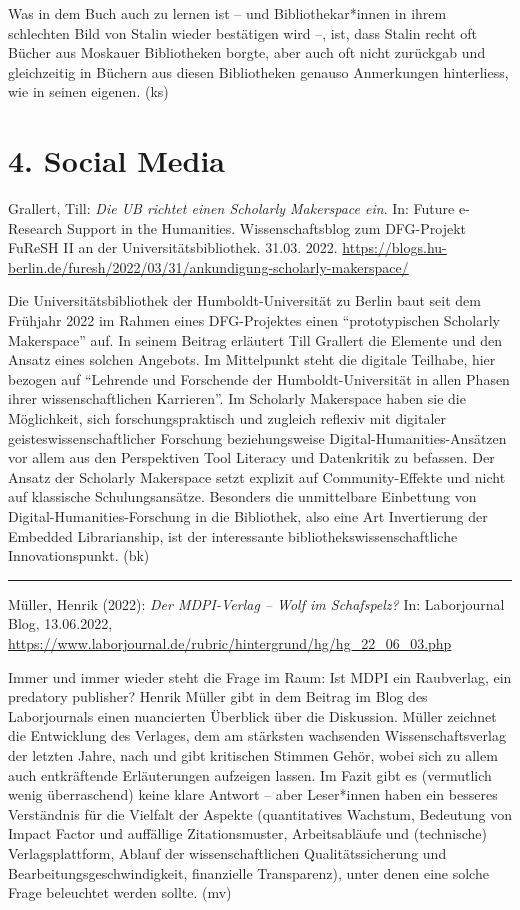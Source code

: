 \documentclass[a4paper,
fontsize=11pt,
oneside,
numbers=noperiodatend,
parskip=half-,
bibliography=totoc,
final
]{scrartcl}
\begin{document}
Was in dem Buch auch zu lernen ist -- und Bibliothekar*innen in ihrem
schlechten Bild von Stalin wieder bestätigen wird --, ist, dass Stalin
recht oft Bücher aus Moskauer Bibliotheken borgte, aber auch oft nicht
zurückgab und gleichzeitig in Büchern aus diesen Bibliotheken genauso
Anmerkungen hinterliess, wie in seinen eigenen. (ks)

\hypertarget{social-media}{%
\section{4. Social Media}\label{social-media}}

Grallert, Till: \emph{Die UB richtet einen Scholarly Makerspace ein}.
In: Future e-Research Support in the Humanities. Wissenschaftsblog zum
DFG-Projekt FuReSH II an der Universitätsbibliothek. 31.03. 2022.
\url{https://blogs.hu-berlin.de/furesh/2022/03/31/ankundigung-scholarly-makerspace/}

Die Universitätsbibliothek der Humboldt-Universität zu Berlin baut seit
dem Frühjahr 2022 im Rahmen eines DFG-Projektes einen
\enquote{prototypischen Scholarly Makerspace} auf. In seinem Beitrag
erläutert Till Grallert die Elemente und den Ansatz eines solchen
Angebots. Im Mittelpunkt steht die digitale Teilhabe, hier bezogen auf
\enquote{Lehrende und Forschende der Humboldt-Universität in allen
Phasen ihrer wissenschaftlichen Karrieren}. Im Scholarly Makerspace
haben sie die Möglichkeit, sich forschungspraktisch und zugleich
reflexiv mit digitaler geisteswissenschaftlicher Forschung
beziehungsweise Digital-Humanities-Ansätzen vor allem aus den
Perspektiven Tool Literacy und Datenkritik zu befassen. Der Ansatz der
Scholarly Makerspace setzt explizit auf Community-Effekte und nicht auf
klassische Schulungsansätze. Besonders die unmittelbare Einbettung von
Digital-Humanities-Forschung in die Bibliothek, also eine Art
Invertierung der Embedded Librarianship, ist der interessante
bibliothekswissenschaftliche Innovationspunkt. (bk)

\begin{center}\rule{0.5\linewidth}{0.5pt}\end{center}

Müller, Henrik (2022): \emph{Der MDPI-Verlag -- Wolf im Schafspelz?} In:
Laborjournal Blog, 13.06.2022,
\url{https://www.laborjournal.de/rubric/hintergrund/hg/hg_22_06_03.php}

Immer und immer wieder steht die Frage im Raum: Ist MDPI ein Raubverlag,
ein predatory publisher? Henrik Müller gibt in dem Beitrag im Blog des
Laborjournals einen nuancierten Überblick über die Diskussion. Müller
zeichnet die Entwicklung des Verlages, dem am stärksten wachsenden
Wissenschaftsverlag der letzten Jahre, nach und gibt kritischen Stimmen
Gehör, wobei sich zu allem auch entkräftende Erläuterungen aufzeigen
lassen. Im Fazit gibt es (vermutlich wenig überraschend) keine klare
Antwort -- aber Leser*innen haben ein besseres Verständnis für die
Vielfalt der Aspekte (quantitatives Wachstum, Bedeutung von Impact
Factor und auffällige Zitationsmuster, Arbeitsabläufe und (technische)
Verlagsplattform, Ablauf der wissenschaftlichen Qualitätssicherung und
Bearbeitungsgeschwindigkeit, finanzielle Transparenz), unter denen eine
solche Frage beleuchtet werden sollte. (mv)
\end{document}
